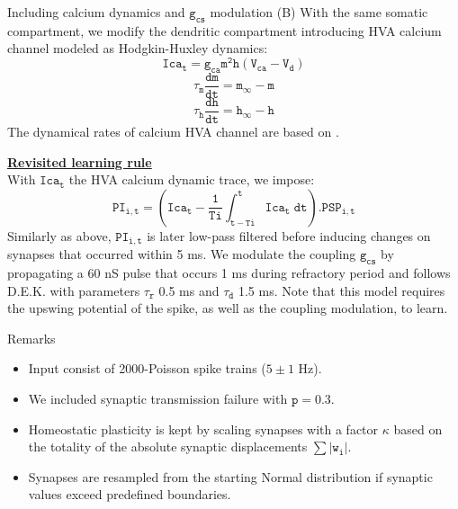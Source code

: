 \documentclass[final]{beamer}
\begin{document}
\begin{frame}
\begin{columns}[t]
\begin{column}{.325\textwidth}
\begin{block}{Including calcium dynamics and $\mathtt{g_{cs}}$ modulation (B)}
  \justify
  With the same somatic compartment, we modify the dendritic compartment introducing HVA calcium channel modeled as Hodgkin-Huxley dynamics:
  \begin{equation*}
    \mathtt{Ica_t = g_{ca}m^2h(V_{ca}-V_d)} \nonumber
  \end{equation*}    
  \begin{equation*} 
    \mathtt{\tau_m} \mathtt{\frac{dm}{dt} = m_{\infty} - m} \nonumber
  \end{equation*}    
   \begin{equation*} 
    \mathtt{\tau_h} \mathtt{\frac{dh}{dt} = h_{\infty} - h} \nonumber 
  \end{equation*}
  The dynamical rates of calcium HVA channel are based on \cite{friedman1993}.

  \underline{\textbf{Revisited learning rule}} \\
  With $\mathtt{Ica_t}$ the HVA calcium dynamic trace, we impose:
\begin{equation}
	\mathtt{PI_{i,t} = (Ica_t - \frac{1}{Ti}\int_{t-Ti}^{t} Ica_t \; dt) . PSP_{i,t}} \nonumber
\end{equation}
  Similarly as above, $\mathtt{PI_{i,t}}$ is later low-pass filtered before inducing changes on synapses that occurred within 5 ms. We modulate the coupling $\mathtt{g_{cs}}$ by propagating a 60 nS pulse that occurs 1 ms during refractory period and follows D.E.K. with parameters $\mathtt{\tau_r}$ 0.5 ms and $\mathtt{\tau_d}$ 1.5 ms. Note that this model requires the upswing potential of the spike, as well as the coupling modulation, to learn.
\end{block}

\begin{block}{Remarks}
  \begin{itemize}
    \item Input consist of 2000-Poisson spike trains ($5 \pm 1$ Hz).
    \item We included synaptic transmission failure with $\mathtt{p = 0.3}$.
    \item Homeostatic plasticity is kept by scaling synapses with a factor $\kappa$ based on the totality of the absolute synaptic displacements $\mathtt{\sum |w_i|}$.
    \item Synapses are resampled from the starting Normal distribution if synaptic values exceed predefined boundaries.
  \end{itemize}
\end{block}


\end{column}
\end{columns}
\end{frame}
\end{document}
